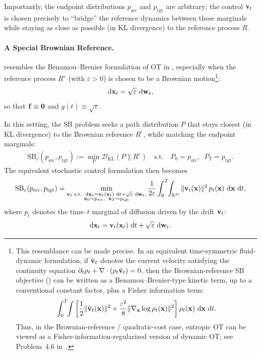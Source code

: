 Importantly, the endpoint distributions $p_{\mathrm{src}}$ and $p_{\mathrm{tgt}}$ are arbitrary;
the control ${\mathbf{v}}_t$ is chosen precisely to ``bridge'' the reference dynamics between
these marginals while staying as close as possible (in KL divergence) to the reference
process $R$.

\paragraph{A Special Brownian Reference.}
 resembles the Benamou--Brenier formulation of OT
in , especially when the reference process
$R^\varepsilon$ (with $\varepsilon>0$) is chosen to be a Brownian
motion\footnote{This resemblance can be made precise. In an equivalent
time-symmetric fluid-dynamic formulation, if $\tilde{{\mathbf{v}}}_t$ denotes
the current velocity satisfying the continuity equation
$\partial_t \rho_t + \nabla \cdot (\rho_t \tilde{{\mathbf{v}}}_t)=0$, then the
Brownian-reference SB objective () can be
written as a Benamou--Brenier-type kinetic term, up to a conventional
constant factor, plus a Fisher information term:
\[
\int_0^T\!\!\int
\left[
\frac{1}{2}\|\tilde{{\mathbf{v}}}_t({\mathbf{x}})\|^2
+
\frac{\varepsilon^2}{8}\|\nabla_{{\mathbf{x}}}\log \rho_t({\mathbf{x}})\|^2
\right]\rho_t({\mathbf{x}})\,\mathop{}\!\mathrm{d}{\mathbf{x}}\,\mathop{}\!\mathrm{d} t.
\]
Thus, in the Brownian-reference / quadratic-cost case, entropic OT can
be viewed as a Fisher-information-regularized version of dynamic OT; see
Problem~4.6 in~\citet{chen2021stochastic}.}:
\[
\mathop{}\!\mathrm{d} {\mathbf{x}}_t = \sqrt{\varepsilon}\,\mathop{}\!\mathrm{d}{\mathbf{w}}_t,
\]
so that ${\mathbf{f}} \equiv \mathbf{0}$ and $g(t) \equiv \sqrt{\varepsilon}$.

In this setting, the SB problem seeks a path distribution $P$ that stays closest
(in KL divergence) to the Brownian reference $R^\varepsilon$, while matching the
endpoint marginals:
\begin{align}\label{eq:sb-epsilon}
    \mathrm{SB}_\varepsilon(p_{\mathrm{src}}, p_{\mathrm{tgt}})
    := \min_{P} \mathcal{D}_{\mathrm{KL}}(P \| R^\varepsilon)
    \quad \text{s.t.} \quad P_0 = p_{\mathrm{src}}, \;\; P_T = p_{\mathrm{tgt}}.
\end{align}
The equivalent stochastic control formulation then becomes
\begin{align}\label{eq:sb-epsilon-kinetic}
\begin{aligned}
    \mathrm{SB}_\varepsilon(p_{\mathrm{src}}, p_{\mathrm{tgt}})
    = \min_{\substack{
        {\mathbf{v}}_t \text{ s.t. } \mathop{}\!\mathrm{d} {\mathbf{x}}_t = {\mathbf{v}}_t({\mathbf{x}}_t)\,\mathop{}\!\mathrm{d} t + \sqrt{\varepsilon}\,\mathop{}\!\mathrm{d} {\mathbf{w}}_t, \\
        {\mathbf{x}}_0 \sim p_{\mathrm{src}},\;\; {\mathbf{x}}_T \sim p_{\mathrm{tgt}}
    }}
    \frac{1}{2\varepsilon}\int_0^T \!\!\int_{\mathbb{R}^D}
        \|{\mathbf{v}}_t({\mathbf{x}})\|^2 \, p_t({\mathbf{x}})\,\mathop{}\!\mathrm{d} {\mathbf{x}}\,\mathop{}\!\mathrm{d} t,
\end{aligned}
\end{align}
where $p_t$ denotes the time--$t$ marginal of diffusion driven by the drift ${\mathbf{v}}_t$:
\[
\mathop{}\!\mathrm{d} {\mathbf{x}}_t = {\mathbf{v}}_t({\mathbf{x}}_t)\,\mathop{}\!\mathrm{d} t + \sqrt{\varepsilon}\,\mathop{}\!\mathrm{d} {\mathbf{w}}_t.
\]



